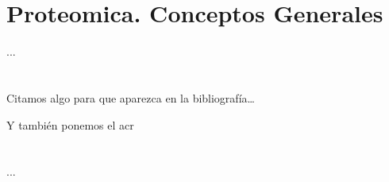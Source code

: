 %






\section{Proteomica. Conceptos Generales}


\label{cap1:sec:introduccion}

...

\section*{\NotasBibliograficas}
\TocNotasBibliograficas

Citamos algo para que aparezca en la bibliografía\ldots
\citep{ldesc2e}

\medskip

Y también ponemos el acr

\section*{\ProximoCapitulo}
\TocProximoCapitulo

...

